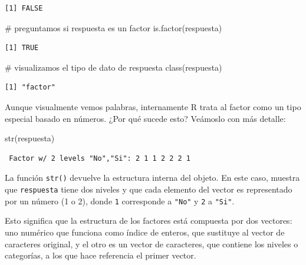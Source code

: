 \documentclass[
  spanish,
  letterpaper,
  DIV=11,
  numbers=noendperiod]{scrreprt}
\newenvironment{Shaded}{\begin{snugshade}}{\end{snugshade}}
\newcommand{\CommentTok}[1]{\textcolor[rgb]{0.37,0.37,0.37}{#1}}
\newcommand{\FunctionTok}[1]{\textcolor[rgb]{0.28,0.35,0.67}{#1}}
\newcommand{\NormalTok}[1]{\textcolor[rgb]{0.00,0.23,0.31}{#1}}
\begin{document}
\begin{verbatim}
[1] FALSE
\end{verbatim}

\begin{Shaded}
\begin{Highlighting}[]
\CommentTok{\# preguntamos si respuesta es un factor}
\FunctionTok{is.factor}\NormalTok{(respuesta)}
\end{Highlighting}
\end{Shaded}

\begin{verbatim}
[1] TRUE
\end{verbatim}

\begin{Shaded}
\begin{Highlighting}[]
\CommentTok{\# visualizamos el tipo de dato de respuesta}
\FunctionTok{class}\NormalTok{(respuesta)}
\end{Highlighting}
\end{Shaded}

\begin{verbatim}
[1] "factor"
\end{verbatim}

Aunque visualmente vemos palabras, internamente R trata al factor como
un tipo especial basado en números. ¿Por qué sucede esto? Veámoslo con
más detalle:

\begin{Shaded}
\begin{Highlighting}[]
\FunctionTok{str}\NormalTok{(respuesta)}
\end{Highlighting}
\end{Shaded}

\begin{verbatim}
 Factor w/ 2 levels "No","Si": 2 1 1 2 2 2 1
\end{verbatim}

La función \texttt{str()} devuelve la estructura interna del objeto. En
este caso, muestra que \texttt{respuesta} tiene dos niveles y que cada
elemento del vector es representado por un número (1 o 2), donde
\texttt{1} corresponde a \texttt{"No"} y \texttt{2} a \texttt{"Si"}.

Esto significa que la estructura de los factores está compuesta por dos
vectores: uno numérico que funciona como índice de enteros, que
sustituye al vector de caracteres original, y el otro es un vector de
caracteres, que contiene los niveles o categorías, a los que hace
referencia el primer vector.
\end{document}
